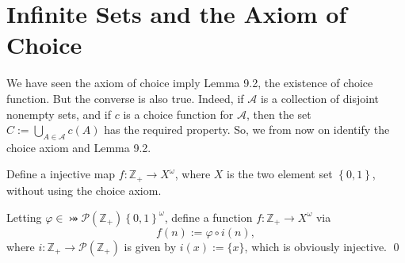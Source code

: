 \documentclass[a4paper,12pt]{article}
\begin{document}
\section{Infinite Sets and the Axiom of Choice}
\setcounter{exe}{0}

\begin{rem}\leavevmode \par
	We have seen
	the axiom of choice imply Lemma 9.2, the existence of choice function.
	But the converse is also true.
	Indeed, if \( \mathcal{A} \) is a collection of disjoint nonempty sets,
	and if \( c \) is a choice function for \( \mathcal{A} \),
	then the set \( C:=\bigcup_{ A \in \mathcal{A}}c(A) \) has the required property.
	So, we from now on identify the choice axiom and Lemma 9.2.
\end{rem}

\begin{exe}
	Define a injective map \( f:\mathbb{Z}_{+} \to X^{\omega} \),
	where \( X \) is the two element set \( \left\{ 0,1 \right\} \),
	without using the choice axiom.
\end{exe}

\begin{sol}
	Letting
	\( \varphi \in \bij{\mathcal{P}(\mathbb{Z}_{+})}{\left\{ 0,1 \right\}^{\omega}} \),
	define a function
	\( f: \mathbb{Z}_{+} \to X^{\omega} \)
	via
	\begin{equation*}
		f(n):=\varphi \circ i(n),
	\end{equation*}
	where \( i: \mathbb{Z}_{+} \to \mathcal{P}(\mathbb{Z}_{+})\)
	is given by
	\( i(x):=\{x\} \),
	which is obviously injective.
	\qed\end{sol}
\end{document}
